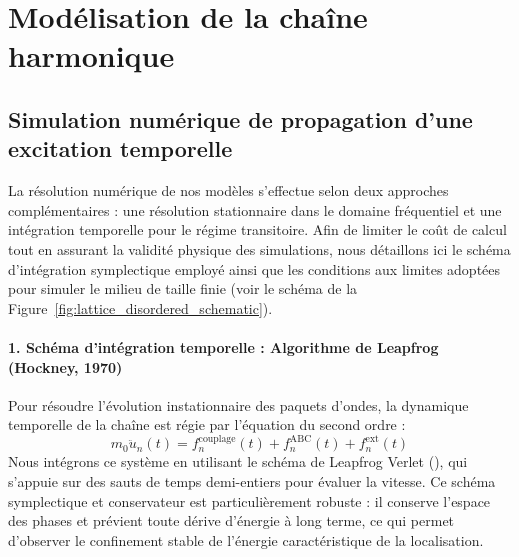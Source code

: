\section[Modélisation de la chaîne]{Modélisation de la chaîne harmonique}

\subsection{Simulation numérique de propagation d'une excitation temporelle}
La résolution numérique de nos modèles s'effectue selon deux approches complémentaires : une résolution stationnaire dans le domaine fréquentiel et une intégration temporelle pour le régime transitoire. Afin de limiter le coût de calcul tout en assurant la validité physique des simulations, nous détaillons ici le schéma d'intégration symplectique employé ainsi que les conditions aux limites adoptées pour simuler le milieu de taille finie (voir le schéma de la Figure~\ref{fig:lattice_disordered_schematic}).

\paragraph{1. Schéma d'intégration temporelle : Algorithme de Leapfrog (Hockney, 1970)}
Pour résoudre l'évolution instationnaire des paquets d'ondes, la dynamique temporelle de la chaîne est régie par l'équation du second ordre :
\begin{equation*}
    m_0 \ddot{u}_n(t) = f_n^{\text{couplage}}(t) + f_n^{\text{ABC}}(t) + f_n^{\text{ext}}(t)
\end{equation*}
Nous intégrons ce système en utilisant le schéma de Leapfrog Verlet (\textcite{hockney1970potential}), qui s'appuie sur des sauts de temps demi-entiers pour évaluer la vitesse. Ce schéma symplectique et conservateur est particulièrement robuste : il conserve l'espace des phases et prévient toute dérive d'énergie à long terme, ce qui permet d'observer le confinement stable de l'énergie caractéristique de la localisation.

